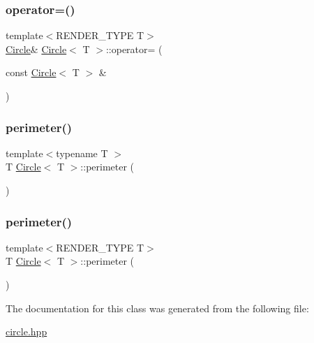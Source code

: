 \mbox{\label{classCircle_a0e3ef62951a8fccaf0635ea21ae73eca}} 
\subsubsection{\texorpdfstring{operator=()}{operator=()}\hspace{0.1cm}{\footnotesize\ttfamily [4/4]}}
{\footnotesize\ttfamily template$<$R\+E\+N\+D\+E\+R\+\_\+\+T\+Y\+PE T$>$ \\
\mbox{\hyperlink{classCircle}{Circle}}\& \mbox{\hyperlink{classCircle}{Circle}}$<$ T $>$\+::operator= (\begin{DoxyParamCaption}\item[{const \mbox{\hyperlink{classCircle}{Circle}}$<$ T $>$ \&}]{ }\end{DoxyParamCaption})\hspace{0.3cm}{\ttfamily [default]}}

\mbox{\label{classCircle_a6f066fc39c0de339b0498b04a56be028}} 
\subsubsection{\texorpdfstring{perimeter()}{perimeter()}\hspace{0.1cm}{\footnotesize\ttfamily [1/2]}}
{\footnotesize\ttfamily template$<$typename T $>$ \\
T \mbox{\hyperlink{classCircle}{Circle}}$<$ T $>$\+::perimeter (\begin{DoxyParamCaption}{ }\end{DoxyParamCaption})}

\mbox{\label{classCircle_a6f066fc39c0de339b0498b04a56be028}} 
\subsubsection{\texorpdfstring{perimeter()}{perimeter()}\hspace{0.1cm}{\footnotesize\ttfamily [2/2]}}
{\footnotesize\ttfamily template$<$R\+E\+N\+D\+E\+R\+\_\+\+T\+Y\+PE T$>$ \\
T \mbox{\hyperlink{classCircle}{Circle}}$<$ T $>$\+::perimeter (\begin{DoxyParamCaption}{ }\end{DoxyParamCaption})}



The documentation for this class was generated from the following file\+:\begin{DoxyCompactItemize}
\item 
\mbox{\hyperlink{circle_8hpp}{circle.\+hpp}}\end{DoxyCompactItemize}
